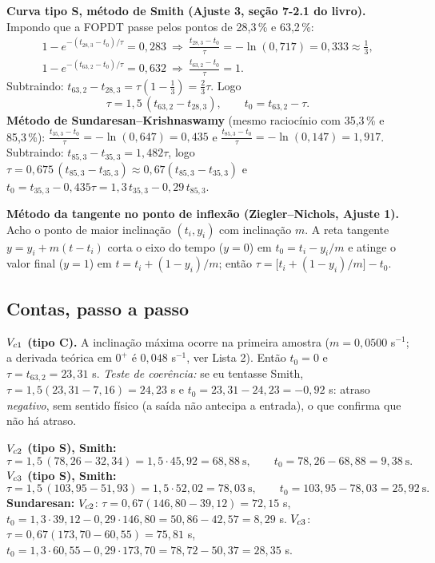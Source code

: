 \textbf{Curva tipo S, método de Smith (Ajuste 3, seção 7-2.1 do livro).} Impondo que a FOPDT passe pelos pontos de 28,3\,\% e 63,2\,\%:
\[\begin{gathered}
1-e^{-(t_{28,3}-t_0)/\tau}=0{,}283\ \Rightarrow\ \frac{t_{28,3}-t_0}{\tau}=-\ln(0{,}717)=0{,}333\approx\frac13,\\
1-e^{-(t_{63,2}-t_0)/\tau}=0{,}632\ \Rightarrow\ \frac{t_{63,2}-t_0}{\tau}=1 .
\end{gathered}\]
Subtraindo: $t_{63,2}-t_{28,3}=\tau(1-\tfrac13)=\tfrac23\tau$. Logo
\[
\boxed{\tau=1{,}5\,(t_{63,2}-t_{28,3}),\qquad t_0=t_{63,2}-\tau .}
\]
\textbf{Método de Sundaresan--Krishnaswamy} (mesmo raciocínio com 35,3\,\% e 85,3\,\%):
$\frac{t_{35,3}-t_0}{\tau}=-\ln(0{,}647)=0{,}435$ e $\frac{t_{85,3}-t_0}{\tau}=-\ln(0{,}147)=1{,}917$. Subtraindo: $t_{85,3}-t_{35,3}=1{,}482\tau$, logo $\tau=0{,}675\,(t_{85,3}-t_{35,3})\approx0{,}67(t_{85,3}-t_{35,3})$ e $t_0=t_{35,3}-0{,}435\tau=1{,}3\,t_{35,3}-0{,}29\,t_{85,3}$.

\textbf{Método da tangente no ponto de inflexão (Ziegler--Nichols, Ajuste 1).} Acho o ponto de maior inclinação $(t_i,y_i)$ com inclinação $m$. A reta tangente $y=y_i+m(t-t_i)$ corta o eixo do tempo ($y=0$) em $t_0=t_i-y_i/m$ e atinge o valor final ($y=1$) em $t=t_i+(1-y_i)/m$; então $\tau=\big[t_i+(1-y_i)/m\big]-t_0$.

\subsection{Contas, passo a passo}
\textbf{$V_{c1}$ (tipo C).} A inclinação máxima ocorre na primeira amostra ($m=0{,}0500$ s$^{-1}$; a derivada teórica em $0^+$ é $0{,}048$ s$^{-1}$, ver Lista 2). Então $t_0=0$ e $\tau=t_{63,2}=23{,}31$ s. \emph{Teste de coerência:} se eu tentasse Smith, $\tau=1{,}5(23{,}31-7{,}16)=24{,}23$ s e $t_0=23{,}31-24{,}23=-0{,}92$ s: atraso \emph{negativo}, sem sentido físico (a saída não antecipa a entrada), o que confirma que não há atraso.

\textbf{$V_{c2}$ (tipo S), Smith:}
\[
\tau=1{,}5\,(78{,}26-32{,}34)=1{,}5\cdot45{,}92=68{,}88\ \mathrm{s},\qquad t_0=78{,}26-68{,}88=9{,}38\ \mathrm{s}.
\]
\textbf{$V_{c3}$ (tipo S), Smith:}
\[
\tau=1{,}5\,(103{,}95-51{,}93)=1{,}5\cdot52{,}02=78{,}03\ \mathrm{s},\qquad t_0=103{,}95-78{,}03=25{,}92\ \mathrm{s}.
\]
\textbf{Sundaresan:} $V_{c2}$: $\tau=0{,}67(146{,}80-39{,}12)=72{,}15$ s, $t_0=1{,}3\cdot39{,}12-0{,}29\cdot146{,}80=50{,}86-42{,}57=8{,}29$ s. $V_{c3}$: $\tau=0{,}67(173{,}70-60{,}55)=75{,}81$ s, $t_0=1{,}3\cdot60{,}55-0{,}29\cdot173{,}70=78{,}72-50{,}37=28{,}35$ s.

